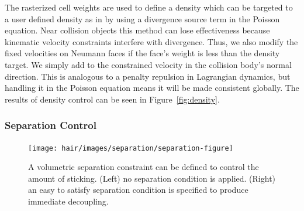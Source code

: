 The rasterized cell weights are used to define a density which can be targeted
to a user defined density as in \cite{losasso:2007:sph} by using a divergence
source term in the Poisson equation. Near collision objects this method can lose
effectiveness because kinematic velocity constraints interfere with
divergence. Thus, we also modify the fixed velocities on Neumann faces if the
face's weight is less than the density target.  We simply add to the constrained
velocity in the collision body's normal direction. This is analogous to a
penalty repulsion in Lagrangian dynamics, but handling it in the Poisson
equation means it will be made consistent globally.  The results of density
control can be seen in Figure~\ref{fig:density}.

\vspace{-5pt}
\subsubsection{Separation Control}
\vspace{-5pt}

\begin{figure}[t]
  \centering
\texttt{[image: hair/images/separation/separation-figure]}
  \caption{\label{fig:separation} A volumetric separation constraint can be
    defined to control the amount of sticking. (Left) no separation condition is
  applied. (Right) an easy to satisfy separation condition is specified to
  produce immediate decoupling.}
\end{figure}


